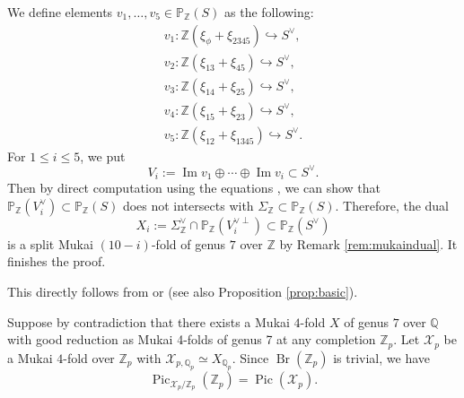 \documentclass[autodetect-engine, a4paper]{amsart}
\theoremstyle{definition}
\def\P{{\mathbb P}}
\def\Q{{\mathbb Q}}
\def\Z{{\mathbb Z}}
\DeclareMathOperator\Pic{\mathrm{Pic}}
\DeclareMathOperator\Br{\mathrm{Br}}
\DeclareMathOperator{\image}{Im}
\begin{document}
We define elements $v_{1}, \ldots, v_{5} \in \P_{\Z}(S)$ as the following:
\begin{eqnarray*}
v_{1} \colon \Z (\xi_{\phi} +\xi_{2345}) \hookrightarrow S^{\vee},\\
v_{2} \colon \Z (\xi_{13} + \xi_{45}) \hookrightarrow S^{\vee},\\
v_{3} \colon \Z (\xi_{14} + \xi_{25}) \hookrightarrow S^{\vee}, \\
v_{4} \colon \Z (\xi_{15} + \xi_{23}) \hookrightarrow S^{\vee}, \\
v_{5} \colon \Z (\xi_{12} + \xi_{1345}) \hookrightarrow S^{\vee}. 
\end{eqnarray*}
For $1 \leq i\leq 5$, we put
\[
V_{i}:= \image v_{1} \oplus \cdots \oplus \image v_{i} \subset S^{\vee}.
\]
Then by direct computation using the equations \cite[(0.1)]{Mukaicurve}, we can show that $\P_{\Z}(V_{i}^{\vee}) \subset \P_{\Z}(S)$  does not intersects with $\Sigma_{\Z} \subset \P_{\Z}(S)$.
Therefore, the dual
\[
X_{i} := \Sigma_{\Z}^{\vee} \cap \P_{\Z}(V_{i}^{\vee \perp}) \subset \P_{\Z}(S^\vee)
\]
is a split Mukai $(10-i)$-fold of genus $7$ over $\Z$ by Remark \ref{rem:mukaindual}. 
It finishes the proof.



\medskip
{}
This directly follows from \cite[Theorem 1]{Fontaine} or \cite[\S 7.6 Theorem]{Abrashkin} (see also Proposition \ref{prop:basic}).



\medskip
{}
Suppose by contradiction that there exists a Mukai $4$-fold $X$ of genus $7$ over $\Q$ with good reduction as Mukai 4-folds of genus 7 at any completion $\Z_{p}$.
Let $\mathcal{X}_{p}$ be a Mukai $4$-fold over $\Z_{p}$ with $\mathcal{X}_{p,\Q_{p}} \simeq X_{\Q_{p}}.$
Since $\Br (\Z_p)$ is trivial, we have 
\[ 
\Pic_{\mathcal{X}_{p}/\Z_{p}} (\Z_{p}) =
\Pic (\mathcal{X}_{p}).
\]
\end{document}
